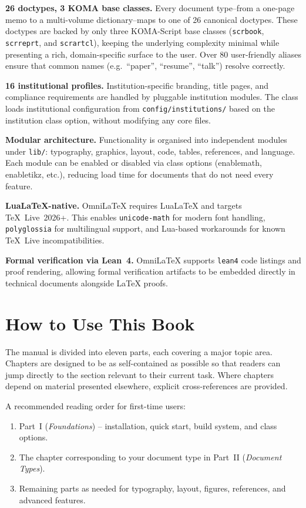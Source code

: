 \textbf{26 doctypes, 3 KOMA base classes.}
Every document type--from a one-page memo to a multi-volume dictionary--maps
to one of 26 canonical doctypes.  These doctypes are backed by only three
KOMA-Script base classes (\texttt{scrbook}, \texttt{scrreprt}, and
\texttt{scrartcl}), keeping the underlying complexity minimal while presenting
a rich, domain-specific surface to the user.  Over 80 user-friendly aliases
ensure that common names (e.g.\ ``paper'', ``resume'', ``talk'') resolve
correctly.

\textbf{16 institutional profiles.}
Institution-specific branding, title pages, and compliance requirements are
handled by pluggable institution modules.  The class loads institutional
configuration from \texttt{config/institutions/} based on the
\textsf{institution} class option, without modifying any core files.

\textbf{Modular architecture.}
Functionality is organised into independent modules under \texttt{lib/}:
typography, graphics, layout, code, tables, references, and language.
Each module can be enabled or disabled via class options
(\textsf{enablemath}, \textsf{enabletikz}, etc.), reducing load time for
documents that do not need every feature.

\textbf{LuaLaTeX-native.}
OmniLaTeX requires LuaLaTeX and targets TeX~Live~2026+.  This enables
\texttt{unicode-math} for modern font handling, \texttt{polyglossia} for
multilingual support, and Lua-based workarounds for known TeX~Live
incompatibilities.

\textbf{Formal verification via Lean~4.}
OmniLaTeX supports \texttt{lean4} code listings and proof rendering,
allowing formal verification artifacts to be embedded directly in technical
documents alongside \LaTeX{} proofs.

\section{How to Use This Book}

The manual is divided into eleven parts, each covering a major topic area.
Chapters are designed to be as self-contained as possible so that readers can
jump directly to the section relevant to their current task.  Where chapters
depend on material presented elsewhere, explicit cross-references are provided.

A recommended reading order for first-time users:

\begin{enumerate}
    \item Part~I (\emph{Foundations}) -- installation, quick start, build
          system, and class options.
    \item The chapter corresponding to your document type in Part~II
          (\emph{Document Types}).
    \item Remaining parts as needed for typography, layout, figures, references,
          and advanced features.
\end{enumerate}

